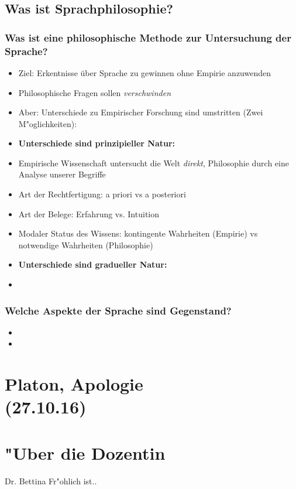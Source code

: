 \documentclass[]{scrartcl}
\begin{document}
\subsection{Was ist Sprachphilosophie?}
\subsubsection{Was ist eine philosophische Methode zur Untersuchung der Sprache?}
\begin{itemize}
  \item Ziel: Erkentnisse über Sprache zu gewinnen ohne Empirie anzuwenden
  \item Philosophische Fragen sollen \emph{verschwinden}
  \item Aber: Unterschiede zu Empirischer Forschung sind umstritten (Zwei M"oglichkeiten):
  \item \textbf{Unterschiede sind prinzipieller Natur:}
  \item Empirische Wissenschaft untersucht die Welt \emph{direkt}, Philosophie durch eine Analyse unserer Begriffe
  \item Art der Rechtfertigung: a priori vs a posteriori
  \item Art der Belege: Erfahrung vs. Intuition
  \item Modaler Status des Wissens: kontingente Wahrheiten (Empirie) vs notwendige Wahrheiten (Philosophie)
  \item \textbf{Unterschiede sind gradueller Natur:}
  \item 
\end{itemize}

\subsubsection{Welche Aspekte der Sprache sind Gegenstand?}

\begin{itemize}
  \item
  \item
\end{itemize}

\newpage

\section{Platon, Apologie\\(27.10.16)}





\newpage
\section{"Uber die Dozentin}
Dr. Bettina Fr"ohlich ist..
\end{document}
